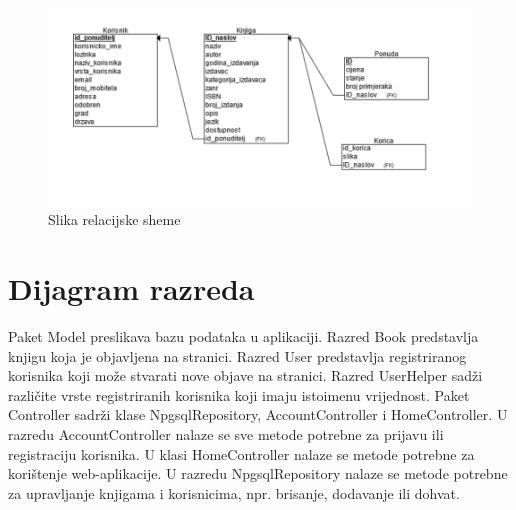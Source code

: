 		\begin{figure}[hbt!]
			\centering
			\includegraphics[width = \textwidth]{slike/Relacijska shema}
			\caption{Slika relacijske sheme}
			\label{fig:enter-label}
		\end{figure}
		
		\eject
			
		\section{Dijagram razreda}
		
			\raggedright{Paket Model preslikava bazu podataka u aplikaciji. Razred Book predstavlja knjigu koja je objavljena na stranici. Razred User predstavlja registriranog korisnika koji može stvarati nove objave na stranici. Razred UserHelper sadži različite vrste registriranih korisnika koji imaju istoimenu vrijednost. Paket Controller sadrži klase NpgsqlRepository, AccountController i HomeController. U razredu AccountController nalaze se sve metode potrebne za prijavu ili registraciju korisnika. U klasi HomeController nalaze se metode potrebne za korištenje web-aplikacije. U razredu NpgsqlRepository nalaze se metode potrebne za upravljanje knjigama i korisnicima, npr. brisanje, dodavanje ili dohvat.}\\
			
			\eject
			
